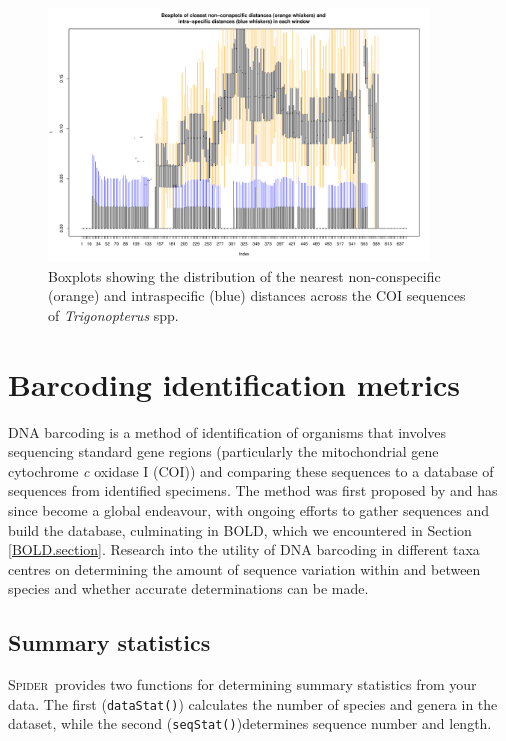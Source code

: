 \documentclass{article}
\newcommand{\spider}{\textsc{Spider}~} %
\newcommand{\fun}[1]{\texttt{#1}}
\begin{document}
\begin{figure}[p]
	\centering
	\includegraphics[width=0.9\textwidth]{weevilsBox}
	\caption{Boxplots showing the distribution of the nearest non-conspecific (orange) and intraspecific (blue) distances across the COI sequences of \emph{Trigonopterus} spp.}
	\label{weevilsBox.fig}
\end{figure}



\section{Barcoding identification metrics}
DNA barcoding is a method of identification of organisms that involves sequencing  standard gene regions (particularly the mitochondrial gene cytochrome \emph{c} oxidase I (COI)) and comparing these sequences to a database of sequences from identified specimens. The method was first proposed by \citet{Her.etal.2003.barcoding} and has since become a global endeavour, with ongoing efforts to gather sequences and build the database, culminating in BOLD, which we encountered in Section \ref{BOLD.section}. Research into the utility of DNA barcoding in different taxa centres on determining the amount of sequence variation within and between species and whether accurate determinations can be made. 

\subsection{Summary statistics}
\spider provides two functions for determining summary statistics from your data. The first (\fun{dataStat()}) calculates the number of species and genera in the dataset, while the second (\fun{seqStat()})determines sequence number and length.
\end{document}
